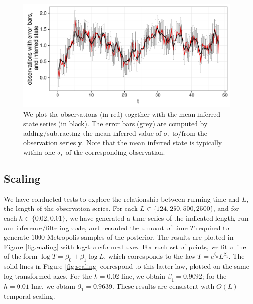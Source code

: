 \documentclass[wcp]{jmlr}
\begin{document}
\begin{figure}[th]
\begin{center}
\includegraphics[width=6in]{timeseries2}
\end{center}
\caption{We plot the observations (in red) together with the mean
  inferred state series (in black).  The
  error bars (grey) are computed by adding/subtracting the mean inferred
  value of $\sigma_\epsilon$ to/from the observation series
  $\mathbf{y}$.  Note that the mean inferred state is typically within
one $\sigma_\epsilon$ of the corresponding observation.}
\label{fig:timeseries2}
\end{figure}

\subsection{Scaling}
\label{sect:scaling}
We have conducted tests to explore the relationship between running
time and $L$, the length
of the observation series.  For each $L \in \{124, 250, 500,
2500\}$, and for each $h \in \{0.02, 0.01\}$, we have generated a
time series of the indicated length, run our inference/filtering code, and
recorded the amount of time $T$ required to generate $1000$ Metropolis
samples of the posterior.  The results are plotted in Figure
\ref{fig:scaling} with log-transformed axes. For each set of points,
we fit a line of the form $\log T = \beta_0 + \beta_1 \log L$, which
corresponds to the law $T = e^{\beta_0} L^{\beta_1}$.  The solid lines
in Figure \ref{fig:scaling} correspond to this latter law, plotted on
the same log-transformed axes.  For the $h=0.02$ line, we obtain
$\beta_1 = 0.9092$; for the $h=0.01$ line, we obtain
$\beta_1=0.9639$.  These results are consistent with $O(L)$ temporal scaling.
\end{document}

